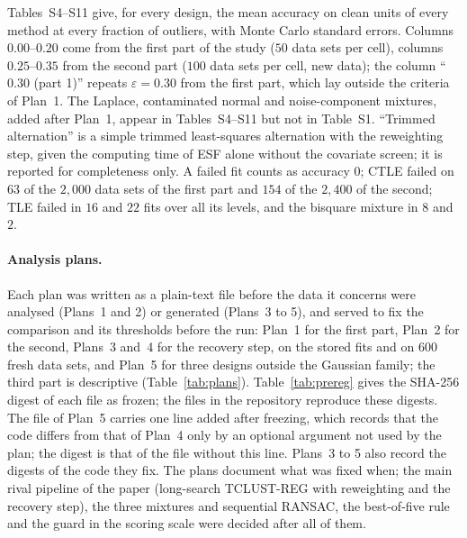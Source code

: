 \documentclass[11pt,a4paper]{article}
\begin{document}
Tables~S4--S11 give, for every design, the mean accuracy on clean units of every method at every
fraction of outliers, with Monte Carlo standard errors. Columns $0.00$--$0.20$ come from the
first part of the study ($50$ data sets per cell), columns $0.25$--$0.35$ from the second part
($100$ data sets per cell, new data); the column ``$0.30$ (part 1)'' repeats $\varepsilon=0.30$ from
the first part, which lay outside the criteria of Plan~1. The Laplace, contaminated normal and
noise-component mixtures, added after Plan~1, appear in Tables~S4--S11 but not in Table~S1.
``Trimmed alternation'' is a simple trimmed least-squares alternation with the reweighting step,
given the computing time of ESF alone without the covariate screen; it is reported for
completeness only. A failed fit counts as accuracy $0$; CTLE failed on $63$ of the $2{,}000$ data
sets of the first part and $154$ of the $2{,}400$ of the second; TLE failed in $16$ and $22$ fits
over all its levels, and the bisquare mixture in $8$ and $2$.

\paragraph{Analysis plans.} Each plan was written as a plain-text file before the data it
concerns were analysed (Plans~1 and 2) or generated (Plans~3 to 5), and served to fix the
comparison and its thresholds before the run: Plan~1 for the first part, Plan~2 for the
second, Plans~3 and~4 for the recovery step, on the stored fits and on $600$ fresh data sets,
and Plan~5 for three designs outside the Gaussian family; the third part is descriptive
(Table~\ref{tab:plans}). Table~\ref{tab:prereg} gives the SHA-256 digest
of each file as frozen;
the files in the repository reproduce these digests. The file of Plan~5 carries one line added
after freezing, which records that the code differs from that of Plan~4 only by an optional
argument not used by the plan; the digest is that of the file without this line. Plans~3 to 5
also record the digests of the code they fix. The plans document what was fixed when; the main
rival pipeline of the paper (long-search TCLUST-REG with reweighting and the recovery step),
the three mixtures and sequential RANSAC, the best-of-five rule and the guard in the scoring
scale were decided after all of them.




\clearpage
\end{document}
